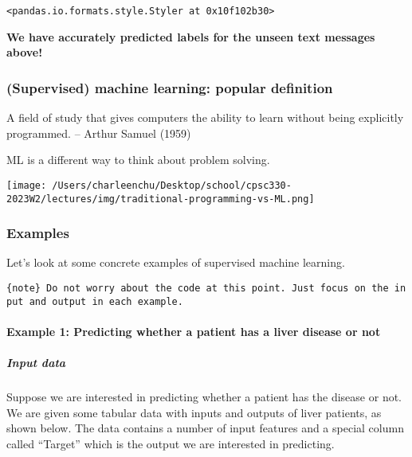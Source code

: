 \documentclass[11pt]{article}
\makeatletter
\newcommand{\boxspacing}{\kern\kvtcb@left@rule\kern\kvtcb@boxsep}
\newcommand{\prompt}[4]{
        {\ttfamily\llap{{\color{#2}[#3]:\hspace{3pt}#4}}\vspace{-\baselineskip}}
    }
\makeatother
\begin{document}
            \begin{tcolorbox}[breakable, size=fbox, boxrule=.5pt, pad at break*=1mm, opacityfill=0]
\prompt{Out}{outcolor}{6}{\boxspacing}
\begin{Verbatim}[commandchars=\\\{\}]
<pandas.io.formats.style.Styler at 0x10f102b30>
\end{Verbatim}
\end{tcolorbox}
        
    \textbf{We have accurately predicted labels for the unseen text messages
above!}

    

    \subsubsection{(Supervised) machine learning: popular
definition}\label{supervised-machine-learning-popular-definition}

A field of study that gives computers the ability to learn without being
explicitly programmed. -- Arthur Samuel (1959)

ML is a different way to think about problem solving.

\texttt{[image: /Users/charleenchu/Desktop/school/cpsc330-2023W2/lectures/img/traditional-programming-vs-ML.png]}

    \subsubsection{Examples}\label{examples}

Let's look at some concrete examples of supervised machine learning.

    \texttt{\{note\}\ Do\ not\ worry\ about\ the\ code\ at\ this\ point.\ Just\ focus\ on\ the\ input\ and\ output\ in\ each\ example.}

    \paragraph{Example 1: Predicting whether a patient has a liver disease
or
not}\label{example-1-predicting-whether-a-patient-has-a-liver-disease-or-not}

    \subparagraph{Input data}\label{input-data}

Suppose we are interested in predicting whether a patient has the
disease or not. We are given some tabular data with inputs and outputs
of liver patients, as shown below. The data contains a number of input
features and a special column called ``Target'' which is the output we
are interested in predicting.
\end{document}
